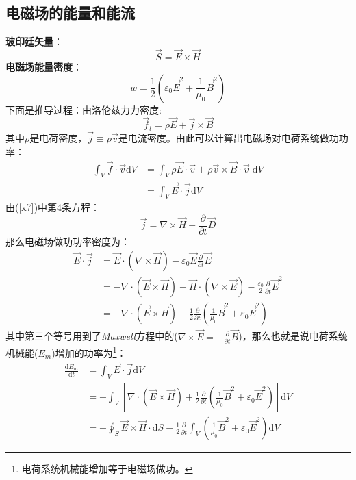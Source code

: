 \documentclass[12pt]{article}
\begin{document}
\subsection{电磁场的能量和能流}
\textbf{玻印廷矢量}：
\begin{equation}
    \Vec{S}=\Vec{E}\times\Vec{H}
    \label{x8}
\end{equation}
\textbf{电磁场能量密度}：
\begin{equation}
    w=\frac{1}{2}(\varepsilon_0 \Vec{E}^2+\frac{1}{\mu_0}\Vec{B}^2)
    \label{x9}
\end{equation}
下面是推导过程：由洛伦兹力力密度:
\begin{equation}
    \Vec{f}_l =\rho\Vec{E}+\Vec{j}\times\Vec{B}
\end{equation}
其中$\rho$是电荷密度，$\Vec{j}\equiv \rho\Vec{v}$是电流密度。由此可以计算出电磁场对电荷系统做功功率：
\begin{equation}
\begin{split}
    \int_V \Vec{f}\cdot\Vec{v}\mathrm{d}V&=\int_V \rho\Vec{E}\cdot \Vec{v}+\rho\Vec{v}\times\Vec{B}\cdot\Vec{v}\;\mathrm{d}V\\
    &=\int_V \Vec{E}\cdot \Vec{j}\mathrm{d}V
\end{split}
\end{equation}
由(\ref{x7})中第4条方程：
\begin{equation}
    \Vec{j}=\nabla\times\Vec{H}-\frac{\partial}{\partial t}\Vec{D}
\end{equation}
那么电磁场做功功率密度为：
\begin{equation}
\begin{split}
    \Vec{E}\cdot\Vec{j}&=\Vec{E}\cdot(\nabla\times\Vec{H})-\varepsilon_0\Vec{E}\frac{\partial}{\partial t}\Vec{E}\\
   &=-\nabla\cdot(\Vec{E}\times \Vec{H})+\Vec{H}\cdot(\nabla\times\Vec{E})-\frac{\varepsilon_0}{2}\frac{\partial}{\partial t }\Vec{E}^2
    \\
    &=-\nabla \cdot (\Vec{E}\times \Vec{H})-\frac{1}{2}\frac{\partial }{\partial t}(\frac{1}{\mu_0}\Vec{B}^2+\varepsilon_0\Vec{E}^2)
    \end{split}
\end{equation}
其中第三个等号用到了\textit{Maxwell}方程中的($\nabla\times\Vec{E}=-\frac{\partial}{\partial t}\Vec{B}$)，那么也就是说电荷系统机械能($E_m$)增加的功率为\footnote{电荷系统机械能增加等于电磁场做功。}：
\begin{equation}
\begin{split}
    \frac{\mathrm{d} E_m}{\mathrm{d}t}&=\int_V \Vec{E}\cdot\Vec{j}\mathrm{d}V\\
    &=-\int_V[\nabla \cdot (\Vec{E}\times \Vec{H})+\frac{1}{2}\frac{\partial }{\partial t}(\frac{1}{\mu_0}\Vec{B}^2+\varepsilon_0\Vec{E}^2)]\mathrm{d}V\\
    &=-\oint_S \Vec{E}\times\Vec{H}\cdot\mathrm{d}S-\frac{1}{2}\frac{\partial}{\partial t}\int_V (\frac{1}{\mu_0}\Vec{B}^2+\varepsilon_0\Vec{E}^2)\mathrm{d}V
    \end{split}
\end{equation}
\end{document}
